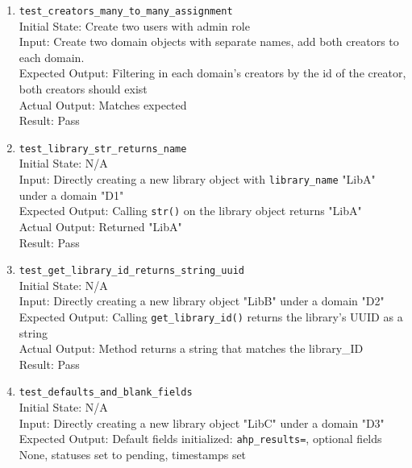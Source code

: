 \documentclass[12pt, titlepage]{article}
\begin{document}
\begin{enumerate}
      \\Expected Output: Throws integrity error due to duplicate domain names
      \\Actual Output: Matches expected
      \\Result: Pass
    \item \texttt{test\_creators\_many\_to\_many\_assignment} \label{test-creators-many-to-many-assignment}
      \\Initial State: Create two users with admin role
      \\Input: Create two domain objects with separate names, add both creators to each domain.
      \\Expected Output: Filtering in each domain's creators by the id of the creator, both creators should exist
      \\Actual Output: Matches expected
      \\Result: Pass
    \item \texttt{test\_library\_str\_returns\_name} \label{test-library-str-returns-name}
      \\Initial State: N/A
      \\Input: Directly creating a new library object with \texttt{library\_name} "LibA" under a domain "D1"
      \\Expected Output: Calling \texttt{str()} on the library object returns "LibA"
      \\Actual Output: Returned "LibA"
      \\Result: Pass
    \item \texttt{test\_get\_library\_id\_returns\_string\_uuid} \label{test-get-library-id-returns-string-uuid}
      \\Initial State: N/A
      \\Input: Directly creating a new library object "LibB" under a domain "D2"
      \\Expected Output: Calling \texttt{get\_library\_id()} returns the library's UUID as a string
      \\Actual Output: Method returns a string that matches the library\_ID
      \\Result: Pass
    \item \texttt{test\_defaults\_and\_blank\_fields} \label{test-defaults-and-blank-fields}
      \\Initial State: N/A
      \\Input: Directly creating a new library object "LibC" under a domain "D3"
      \\Expected Output: Default fields initialized: \texttt{ahp\_results={}}, optional fields None, statuses set to pending, timestamps set

\end{enumerate}
\end{document}
